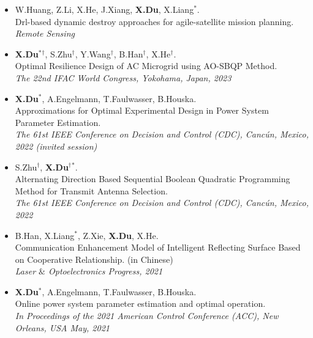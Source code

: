 \documentclass[paper=a4,fontsize=11pt]{scrartcl} %
\begin{document}
\begin{itemize}
%	
	\item [\textbf{J2}] {W.Huang, Z.Li, X.He, J.Xiang, \textbf{X.Du}, X.Liang$^*$. \\
	{Drl-based dynamic destroy approaches for agile-satellite mission planning.}\\
	\emph{Remote Sensing
} }
		\item [\textbf{C6}] {\textbf{X.Du}$^*$$^{\dag}$, S.Zhu$^{\dag}$, Y.Wang$^{\dag}$, B.Han$^{\dag}$, X.He$^{\dag}$. \\
		{Optimal Resilience Design of AC Microgrid using AO-SBQP Method.}\\
		\emph{The 22nd IFAC World Congress, Yokohama, Japan, 2023
	} }
	
		\item [\textbf{C5}] { \textbf{X.Du}$^*$, A.Engelmann, T.Faulwasser, B.Houska. \\
		{Approximations for Optimal Experimental Design
			in Power System Parameter Estimation. }\\
		\emph{ The 61st IEEE Conference on Decision and Control (CDC), Canc\'un, Mexico, 2022 (invited session)
		} }
	
	
	\item [\textbf{C4}] { S.Zhu$^{\dag}$, \textbf{X.Du}$^{\dag}$$^*$. \\
		{Alternating Direction Based Sequential Boolean Quadratic Programming Method for Transmit Antenna Selection.}\\
		\emph{ The 61st IEEE Conference on Decision and Control (CDC), Canc\'un, Mexico, 2022
	} }
	
		\item [\textbf{J1}] { B.Han, X.Liang$^*$, Z.Xie, \textbf{X.Du}, X.He. \\
		{Communication Enhancement Model of Intelligent Reflecting Surface Based on Cooperative Relationship. (in Chinese)}\\
		\emph{Laser $\&$ Optoelectronics Progress, 2021
	} }
	
	\item [\textbf{C3}] { \textbf{X.Du}$^*$, A.Engelmann, T.Faulwasser, B.Houska. \\
		{Online power system parameter estimation and optimal operation.}\\
		\emph{In Proceedings of the 2021 American Control Conference (ACC), New Orleans, USA May, 2021
	} }
	

\end{itemize}
\end{document}
